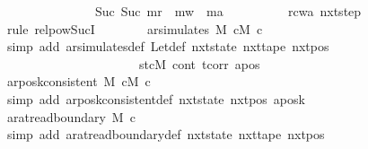 \begin{isabellebody}
\ \ \ \ \ \ \ \ \ \ \ \ \ \ {\isacharcircum}{\kern0pt}{\isacharcircum}{\kern0pt}\ Suc\ {\isacharparenleft}{\kern0pt}Suc\ m{\isacharunderscore}{\kern0pt}r\ {\isacharplus}{\kern0pt}\ m{\isacharunderscore}{\kern0pt}w\ {\isacharplus}{\kern0pt}\ m{\isacharunderscore}{\kern0pt}a{\isacharparenright}{\kern0pt}{\isachardoublequoteclose}\isanewline
\ \ \ \ \ \ \ \ \isamarkupfalse%
\ rcwa\ nxt{\isacharunderscore}{\kern0pt}step\ \isamarkupfalse%
\ {\isacharparenleft}{\kern0pt}rule\ relpow{\isacharunderscore}{\kern0pt}Suc{\isacharunderscore}{\kern0pt}I{\isacharparenright}{\kern0pt}\isanewline
\ \ \ \ \ \ \isamarkupfalse%
\ {\isachardoublequoteopen}ar{\isacharunderscore}{\kern0pt}simulates\ M\ cM{\isacharunderscore}{\kern0pt}{}\ c{\isacharprime}{\kern0pt}{\isacharprime}{\kern0pt}{\isachardoublequoteclose}\isanewline
\ \ \ \ \ \ \ \ \isamarkupfalse%
\ {\isacharparenleft}{\kern0pt}simp\ add{\isacharcolon}{\kern0pt}\ ar{\isacharunderscore}{\kern0pt}simulates{\isacharunderscore}{\kern0pt}def\ Let{\isacharunderscore}{\kern0pt}def\ nxt{\isacharunderscore}{\kern0pt}state\ nxt{\isacharunderscore}{\kern0pt}tape\ nxt{\isacharunderscore}{\kern0pt}pos\isanewline
\ \ \ \ \ \ \ \ \ \ \ \ \ \ \ \ \ \ \ \ \ \ st{\isacharunderscore}{\kern0pt}cM{}\ cont\ tcorr{\isacharunderscore}{\kern0pt}{}\ apos{\isacharunderscore}{\kern0pt}{}{\isacharparenright}{\kern0pt}\isanewline
\ \ \ \ \ \ \isamarkupfalse%
\ {\isachardoublequoteopen}ar{\isacharunderscore}{\kern0pt}posk{\isacharunderscore}{\kern0pt}consistent\ M\ cM{\isacharunderscore}{\kern0pt}{}\ c{\isacharprime}{\kern0pt}{\isacharprime}{\kern0pt}{\isachardoublequoteclose}\isanewline
\ \ \ \ \ \ \ \ \isamarkupfalse%
\ {\isacharparenleft}{\kern0pt}simp\ add{\isacharcolon}{\kern0pt}\ ar{\isacharunderscore}{\kern0pt}posk{\isacharunderscore}{\kern0pt}consistent{\isacharunderscore}{\kern0pt}def\ nxt{\isacharunderscore}{\kern0pt}state\ nxt{\isacharunderscore}{\kern0pt}pos\ aposk{\isacharunderscore}{\kern0pt}{}{\isacharparenright}{\kern0pt}\isanewline
\ \ \ \ \ \ \isamarkupfalse%
\ {\isachardoublequoteopen}ar{\isacharunderscore}{\kern0pt}at{\isacharunderscore}{\kern0pt}read{\isacharunderscore}{\kern0pt}boundary\ M\ c{\isacharprime}{\kern0pt}{\isacharprime}{\kern0pt}{\isachardoublequoteclose}\isanewline
\ \ \ \ \ \ \ \ \isamarkupfalse%
\ {\isacharparenleft}{\kern0pt}simp\ add{\isacharcolon}{\kern0pt}\ ar{\isacharunderscore}{\kern0pt}at{\isacharunderscore}{\kern0pt}read{\isacharunderscore}{\kern0pt}boundary{\isacharunderscore}{\kern0pt}def\ nxt{\isacharunderscore}{\kern0pt}state\ nxt{\isacharunderscore}{\kern0pt}tape\ nxt{\isacharunderscore}{\kern0pt}pos\isanewline

\end{isabellebody}
